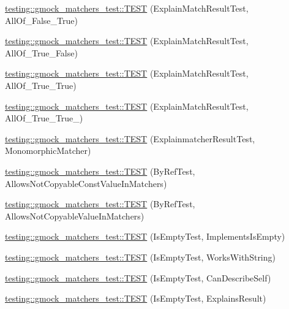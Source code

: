 \begin{DoxyCompactItemize}
\item 
\hyperlink{namespacetesting_1_1gmock__matchers__test_a099aebb5417d5bd85e11aefe935ec345}{testing\+::gmock\+\_\+matchers\+\_\+test\+::\+T\+E\+ST} (Explain\+Match\+Result\+Test, All\+Of\+\_\+\+False\+\_\+\+True)
\item 
\hyperlink{namespacetesting_1_1gmock__matchers__test_a5d386691eaed59994a1d2b65f94b23a9}{testing\+::gmock\+\_\+matchers\+\_\+test\+::\+T\+E\+ST} (Explain\+Match\+Result\+Test, All\+Of\+\_\+\+True\+\_\+\+False)
\item 
\hyperlink{namespacetesting_1_1gmock__matchers__test_a16545b298640b253502d604f52ea95e2}{testing\+::gmock\+\_\+matchers\+\_\+test\+::\+T\+E\+ST} (Explain\+Match\+Result\+Test, All\+Of\+\_\+\+True\+\_\+\+True)
\item 
\hyperlink{namespacetesting_1_1gmock__matchers__test_af1ba4010a24716a51a302f9a518023b5}{testing\+::gmock\+\_\+matchers\+\_\+test\+::\+T\+E\+ST} (Explain\+Match\+Result\+Test, All\+Of\+\_\+\+True\+\_\+\+True\+\_)
\item 
\hyperlink{namespacetesting_1_1gmock__matchers__test_a102b10d9064f6e0037e3f3f0c3e76e22}{testing\+::gmock\+\_\+matchers\+\_\+test\+::\+T\+E\+ST} (Explainmatcher\+Result\+Test, Monomorphic\+Matcher)
\item 
\hyperlink{namespacetesting_1_1gmock__matchers__test_aab82f120c70dc7d8bc2fd74ac6897486}{testing\+::gmock\+\_\+matchers\+\_\+test\+::\+T\+E\+ST} (By\+Ref\+Test, Allows\+Not\+Copyable\+Const\+Value\+In\+Matchers)
\item 
\hyperlink{namespacetesting_1_1gmock__matchers__test_a5ed7b822889a34f018c2ba8f21941fd4}{testing\+::gmock\+\_\+matchers\+\_\+test\+::\+T\+E\+ST} (By\+Ref\+Test, Allows\+Not\+Copyable\+Value\+In\+Matchers)
\item 
\hyperlink{namespacetesting_1_1gmock__matchers__test_ab63796f77c7572f6f1aef01cb140f99e}{testing\+::gmock\+\_\+matchers\+\_\+test\+::\+T\+E\+ST} (Is\+Empty\+Test, Implements\+Is\+Empty)
\item 
\hyperlink{namespacetesting_1_1gmock__matchers__test_a22f0cacccee169b7390741b9815f4281}{testing\+::gmock\+\_\+matchers\+\_\+test\+::\+T\+E\+ST} (Is\+Empty\+Test, Works\+With\+String)
\item 
\hyperlink{namespacetesting_1_1gmock__matchers__test_adcf3743190f973f2773296d0772e8950}{testing\+::gmock\+\_\+matchers\+\_\+test\+::\+T\+E\+ST} (Is\+Empty\+Test, Can\+Describe\+Self)
\item 
\hyperlink{namespacetesting_1_1gmock__matchers__test_a1c168c284000d05d63bf5e9df10d1b7c}{testing\+::gmock\+\_\+matchers\+\_\+test\+::\+T\+E\+ST} (Is\+Empty\+Test, Explains\+Result)

\end{DoxyCompactItemize}
